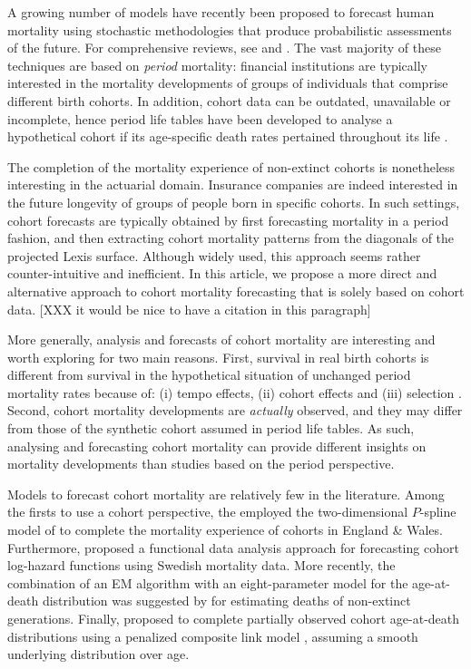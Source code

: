 \documentclass[11pt, a4paper]{article}
\begin{document}
A growing number of models have recently been proposed to forecast human mortality using stochastic methodologies that produce probabilistic assessments of the future. For comprehensive reviews, see \cite{booth2006demographic} and \cite{shang2011point}. The vast majority of these techniques are based on \textit{period} mortality: financial institutions are typically interested in the mortality developments of groups of individuals that comprise different birth cohorts. In addition, cohort data can be outdated, unavailable or incomplete, hence period life tables have been developed to analyse a hypothetical cohort if its age-specific death rates pertained throughout its life \citep{preston2001demogr}.
 
The completion of the mortality experience of non-extinct cohorts is nonetheless interesting in the actuarial domain. Insurance companies are indeed interested in the future longevity of groups of people born in specific cohorts. In such settings, cohort forecasts are typically obtained by first forecasting mortality in a period fashion, and then extracting cohort mortality patterns from the diagonals of the projected Lexis surface. Although widely used, this approach seems rather counter-intuitive and inefficient. In this article, we propose a more direct and alternative approach to cohort mortality forecasting that is solely based on cohort data. [XXX it would be nice to have a citation in this paragraph]

More generally, analysis and forecasts of cohort mortality are interesting and worth exploring for two main reasons. First, survival in real birth cohorts is different from survival in the hypothetical situation of unchanged period mortality rates because of: (i) tempo effects, (ii) cohort effects and (iii) selection \cite[for a full discussion, see][Sect.~2]{borgan2018cohort}. Second, cohort mortality developments are \textit{actually} observed, and they may differ from those of the synthetic cohort assumed in period life tables. As such, analysing and forecasting cohort mortality can provide different insights on mortality developments than studies based on the period perspective.  

Models to forecast cohort mortality are relatively few in the literature. Among the firsts to use a cohort perspective, the \cite{cmi2007stochastic} employed the two-dimensional $P$-spline model of \cite{currie2004smoothing} to complete the mortality experience of cohorts in England \& Wales. Furthermore, \cite{chiou2009modeling} proposed a functional data analysis approach for forecasting cohort log-hazard functions using Swedish mortality data. More recently, the combination of an EM algorithm with an eight-parameter model for the age-at-death distribution was suggested by \cite{zanotto2017reconstruction} for estimating 
deaths of non-extinct generations. Finally, \cite{rizzi2019forecasting} proposed to complete partially observed cohort age-at-death distributions using a penalized composite link model \citep{eilers2007ill}, assuming a smooth underlying distribution over age. 
\end{document}
